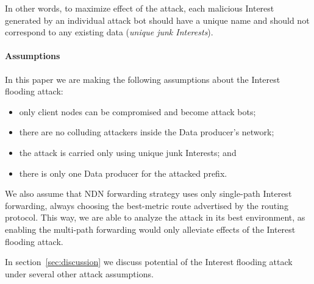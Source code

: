 In other words, to maximize effect of the attack, each malicious Interest generated by an individual attack bot should have a unique name and should not correspond to any existing data (\emph{unique junk Interests}).

\paragraph{Assumptions}

In this paper we are making the following assumptions about the Interest flooding attack:
\begin{itemize}
\item only client nodes can be compromised and become attack bots;
\item there are no colluding attackers inside the Data producer's network;
\item the attack is carried only using unique junk Interests; and
\item there is only one Data producer for the attacked prefix.
\end{itemize}

We also assume that NDN forwarding strategy uses only single-path Interest forwarding, always choosing the best-metric route advertised by the routing protocol.
This way, we are able to analyze the attack in its best environment, as enabling the multi-path forwarding would only alleviate effects of the Interest flooding attack.

In section~\ref{sec:discussion} we discuss potential of the Interest flooding attack under several other attack assumptions.

